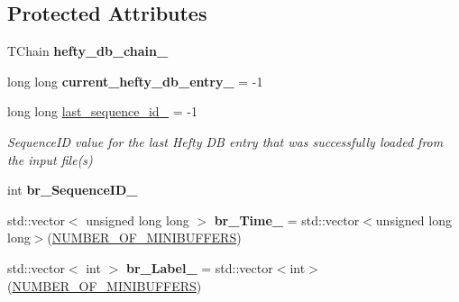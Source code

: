 \subsection*{Protected Attributes}
\begin{DoxyCompactItemize}
\item 
\hypertarget{classannie_1_1HeftyTreeReader_a2f6016952ec8fc83955a081115eb2cb5}{T\-Chain {\bfseries hefty\-\_\-db\-\_\-chain\-\_\-}}\label{classannie_1_1HeftyTreeReader_a2f6016952ec8fc83955a081115eb2cb5}

\item 
\hypertarget{classannie_1_1HeftyTreeReader_a4e71c6e864c27fe549da00eb42d0aff0}{long long {\bfseries current\-\_\-hefty\-\_\-db\-\_\-entry\-\_\-} = -\/1}\label{classannie_1_1HeftyTreeReader_a4e71c6e864c27fe549da00eb42d0aff0}

\item 
\hypertarget{classannie_1_1HeftyTreeReader_ae8a407035678cd910f1a5a6a7ccef830}{long long \hyperlink{classannie_1_1HeftyTreeReader_ae8a407035678cd910f1a5a6a7ccef830}{last\-\_\-sequence\-\_\-id\-\_\-} = -\/1}\label{classannie_1_1HeftyTreeReader_ae8a407035678cd910f1a5a6a7ccef830}

\begin{DoxyCompactList}\small\item\em Sequence\-I\-D value for the last Hefty D\-B entry that was successfully loaded from the input file(s) \end{DoxyCompactList}\item 
\hypertarget{classannie_1_1HeftyTreeReader_a5a38c0a83f580383467151e1140154dd}{int {\bfseries br\-\_\-\-Sequence\-I\-D\-\_\-}}\label{classannie_1_1HeftyTreeReader_a5a38c0a83f580383467151e1140154dd}

\item 
\hypertarget{classannie_1_1HeftyTreeReader_a89d2ab671487ff45f0589bc0f2482191}{std\-::vector$<$ unsigned long long $>$ {\bfseries br\-\_\-\-Time\-\_\-} = std\-::vector$<$unsigned long long$>$(\hyperlink{classannie_1_1HeftyTreeReader_a3ed132051c32e82aa67c7df43eacd77c}{N\-U\-M\-B\-E\-R\-\_\-\-O\-F\-\_\-\-M\-I\-N\-I\-B\-U\-F\-F\-E\-R\-S})}\label{classannie_1_1HeftyTreeReader_a89d2ab671487ff45f0589bc0f2482191}

\item 
\hypertarget{classannie_1_1HeftyTreeReader_acf32379d810b8a05d2b67f6896efecf2}{std\-::vector$<$ int $>$ {\bfseries br\-\_\-\-Label\-\_\-} = std\-::vector$<$int$>$(\hyperlink{classannie_1_1HeftyTreeReader_a3ed132051c32e82aa67c7df43eacd77c}{N\-U\-M\-B\-E\-R\-\_\-\-O\-F\-\_\-\-M\-I\-N\-I\-B\-U\-F\-F\-E\-R\-S})}\label{classannie_1_1HeftyTreeReader_acf32379d810b8a05d2b67f6896efecf2}


\end{DoxyCompactItemize}
